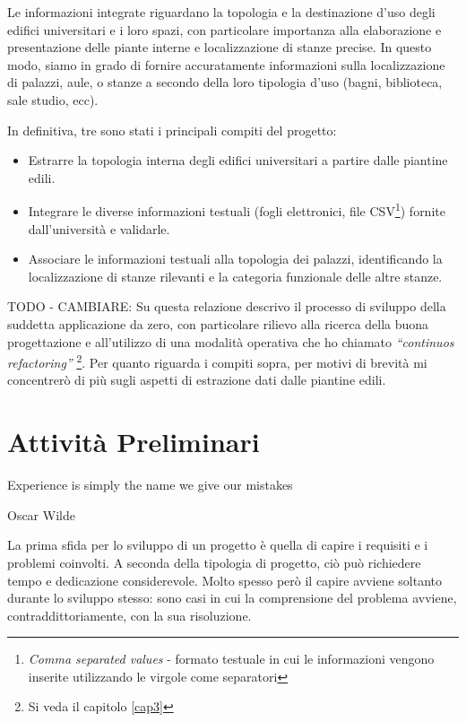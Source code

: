 \documentclass[12pt]{report}
\begin{document}
Le informazioni integrate riguardano la topologia e la destinazione d'uso degli edifici universitari e i loro spazi, con particolare importanza alla elaborazione e presentazione delle piante interne e localizzazione di stanze precise. In questo modo, siamo in grado di fornire accuratamente informazioni sulla localizzazione di palazzi, aule, o stanze a secondo della loro tipologia d'uso (bagni, biblioteca, sale studio, ecc).

In definitiva, tre sono stati i principali compiti del progetto:
\begin{itemize}
  \item Estrarre la topologia interna degli edifici universitari a partire dalle piantine edili.
  \item Integrare le diverse informazioni testuali (fogli elettronici, file CSV\footnote{\textit{Comma separated values} - formato testuale in cui le informazioni vengono inserite utilizzando le virgole come separatori}) fornite dall'università e validarle.
  \item Associare le informazioni testuali alla topologia dei palazzi, identificando la localizzazione di stanze rilevanti e la categoria funzionale delle altre stanze.
\end{itemize}


TODO - CAMBIARE:
Su questa relazione descrivo il processo di sviluppo della suddetta applicazione da zero, con particolare rilievo alla ricerca della buona progettazione e all'utilizzo di una modalità operativa che ho chiamato \textit{“continuos refactoring”} \footnote{Si veda il capitolo \ref{cap3}}. Per quanto riguarda i compiti sopra, per motivi di brevità mi concentrerò di più sugli aspetti di estrazione dati dalle piantine edili.

% 
% 
\chapter{Attività Preliminari}
\label{cap2}

\epigraph{Experience is simply the name we give our mistakes}{Oscar Wilde}

La prima sfida per lo sviluppo di un progetto è quella di capire i requisiti e i problemi coinvolti. A seconda della tipologia di progetto, ciò può richiedere tempo e dedicazione considerevole. Molto spesso però il capire avviene soltanto durante lo sviluppo stesso: sono casi in cui la comprensione del problema avviene, contraddittoriamente, con la sua risoluzione.
\end{document}
